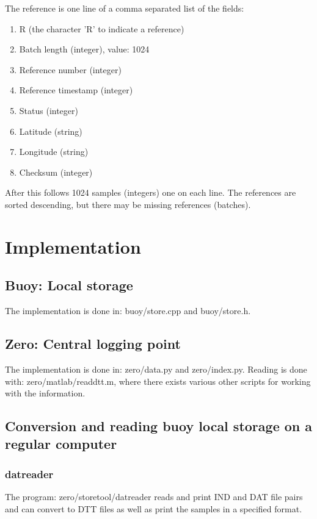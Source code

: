 \documentclass[a4paper]{article}
\begin{document}
\begin{multicols}{2}
  The reference is one line of a comma separated list of the fields: \\
  \begin{enumerate}
    \item R (the character 'R' to indicate a reference)
    \item Batch length (integer), value: 1024
    \item Reference number (integer)
    \item Reference timestamp (integer)
    \item Status (integer)
    \item Latitude (string)
    \item Longitude (string)
    \item Checksum (integer)
  \end{enumerate}

  After this follows 1024 samples (integers) one on each line. The
  references are sorted descending, but there may be missing references
  (batches).

  \section{Implementation}
  \subsection{Buoy: Local storage}
  The implementation is done in: buoy/store.cpp and buoy/store.h.

  \subsection{Zero: Central logging point}
  The implementation is done in: zero/data.py and zero/index.py. Reading
  is done with: zero/matlab/readdtt.m, where there exists various other
  scripts for working with the information.

  \subsection{Conversion and reading buoy local storage on a regular
  computer}

  \subsubsection{datreader} The program: zero/storetool/datreader reads
  and print IND and DAT file pairs and can convert to DTT files as well
  as print the samples in a specified format.


\end{multicols}
\end{document}
